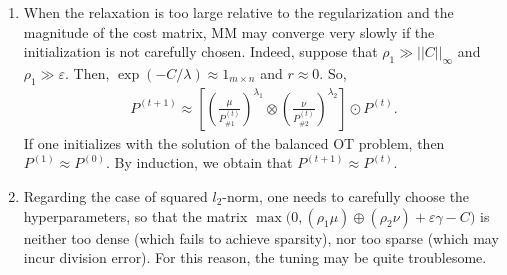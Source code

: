 \begin{enumerate}
  \item When the relaxation is too large relative to the regularization and
  the magnitude of the cost matrix, MM may converge very slowly if the initialization is
  not carefully chosen. Indeed, suppose that $\rho_1 \gg ||C||_{\infty}$ and $\rho_1 \gg \varepsilon$.
  Then, $\exp(-C / \lambda) \approx 1_{m \times n}$ and $r \approx 0$. So,
  \begin{align}
    P^{(t+1)} \approx \left[ \left( \frac{\mu}{P^{(t)}_{\# 1}}\right)^{\lambda_1} \otimes
    \left( \frac{\nu}{P^{(t)}_{\# 2}}\right)^{\lambda_2} \right] \odot P^{(t)}.
  \end{align}
  If one initializes with the solution of the balanced OT problem, then $P^{(1)} \approx P^{(0)}$.
  By induction, we obtain that $P^{(t+1)} \approx P^{(t)}$.

  \item Regarding the case of squared $l_2$-norm, one needs to carefully choose
  the hyperparameters, so that the matrix
  $\max \Big(0, (\rho_1 \mu) \oplus (\rho_2 \nu) + \varepsilon \gamma - C \Big)$ is
  neither too dense (which fails to achieve sparsity), nor too sparse (which may incur division error).
  For this reason, the tuning may be quite troublesome.
\end{enumerate}

